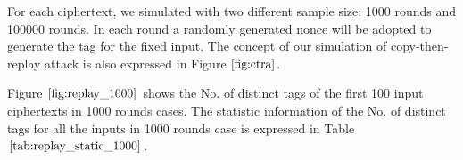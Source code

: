 \documentclass{article}
\begin{document}
For each ciphertext, we simulated with two different sample size: 1000 rounds and 100000 rounds. In each round a randomly generated nonce will be adopted to generate the tag for the fixed input. The concept of our simulation of copy-then-replay attack is also expressed in Figure $\ref{fig:ctra}$.

Figure $\ref{fig:replay_1000}$ shows the No. of distinct tags of the first 100 input ciphertexts in 1000 rounds cases. The statistic information of the No. of distinct tags for all the inputs in 1000 rounds case is expressed in Table $\ref{tab:replay_static_1000}$. 
\begin{figure}  
  \centering
  \hspace{0in}
  \hspace{0in}

\end{figure}
\end{document}

